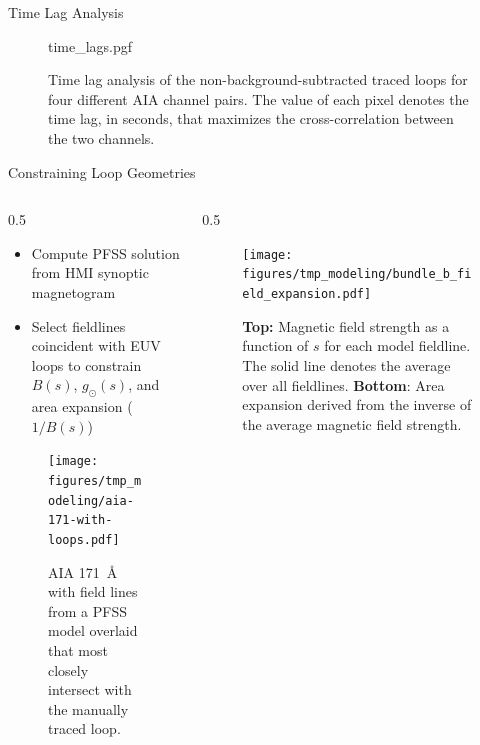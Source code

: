 \documentclass[final]{beamer}
\newlength{\colwidth}
\begin{document}
\begin{frame}[t]
\begin{columns}[t]
\begin{column}{\colwidth}
\begin{block}{Time Lag Analysis}
    \begin{figure}
      \centering
      {time_lags.pgf}
      \caption{Time lag analysis of the non-background-subtracted traced loops for four different AIA channel pairs. The value of each pixel denotes the time lag, in seconds, that maximizes the cross-correlation between the two channels.}
      \label{fig:timelags}
    \end{figure}
  
  \end{block}

  \begin{block}{Constraining Loop Geometries}

    \begin{columns}[b]
      \begin{column}{0.5\colwidth}
        \centering
        \begin{itemize}
          \item Compute PFSS solution from HMI synoptic magnetogram
          \item Select fieldlines coincident with EUV loops to constrain $B(s)$, $g_\odot(s)$, and area expansion ($1/B(s)$)
        \end{itemize}
        \begin{figure}
          \centering
          \texttt{[image: figures/tmp\_modeling/aia-171-with-loops.pdf]}
          \caption{AIA \SI{171}{\angstrom} with field lines from a PFSS model overlaid that most closely intersect with the manually traced loop.}
          \label{fig:aia_fieldlines_overlaid}
        \end{figure}
      \end{column}
      \begin{column}{0.5\colwidth}
        \begin{figure}
          \centering
          \texttt{[image: figures/tmp\_modeling/bundle\_b\_field\_expansion.pdf]}
          \caption{\textbf{Top:} Magnetic field strength as a function of $s$ for each model fieldline. The solid line denotes the average over all fieldlines. \textbf{Bottom}: Area expansion derived from the inverse of the average magnetic field strength.}
          \label{fig:b_field_bundle}
        \end{figure}
      \end{column}
    \end{columns}
    
  \end{block}


\end{column}
\end{columns}
\end{frame}
\end{document}
